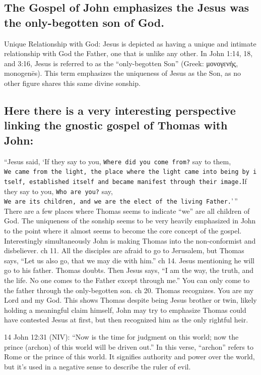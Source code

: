 \subsection{The Gospel of John emphasizes the Jesus was the only-begotten son of God.}\label{subsec:the-gospel-of-john-emphasizes-the-jesus-was-the-only-begotten-son-of-god.}

Unique Relationship with God: Jesus is depicted as having a unique and intimate relationship with God the Father, one that is unlike any other.
In John 1:14, 18, and 3:16, Jesus is referred to as the ``only-begotten Son'' (Greek: μονογενής, monogenēs).
This term emphasizes the uniqueness of Jesus as the Son, as no other figure shares this same divine sonship.

\subsection{Here there is a very interesting perspective linking the gnostic gospel of Thomas with John:}\label{subsec:here-there-is-a-very-interesting-perspective-linking-the-gnostic-gospel-of-thomas-with-john}

``Jesus said, `If they say to you, \texttt{Where\ did\ you\ come\ from?} say to them, \texttt{We\ came\ from\ the\ light,\ the\ place\ where\ the\ light\ came\ into\ being\ by\ itself,\ established\ itself\ and\ became\ manifest\ through\ their\ image.}If they say to you, \texttt{Who\ are\ you?} say, \texttt{We\ are\ its\ children,\ and\ we\ are\ the\ elect\ of\ the\ living\ Father.}'\,'' There are a few places where Thomas seems to indicate ``we'' are all children of God.
The uniqueness of the sonship seems to be very heavily emphasized in John to the point where it almost seems to become the core concept of the gospel.
Interestingly simultaneously John is making Thomas into the non-conformist and disbeliever.
ch 11.
All the disciples are afraid to go to Jerusalem, but Thomas says, ``Let us also go, that we may die with him.'' ch 14.
Jesus mentioning he will go to his father.
Thomas doubts.
Then Jesus says, ``I am the way, the truth, and the life.
No one comes to the Father except through me.'' You can only come to the father through the only-begotten son.
ch 20.
Thomas recognizes.
You are my Lord and my God.
This shows Thomas despite being Jesus brother or twin, likely holding a meaningful claim himself, John may try to emphasize Thomas could have contested Jesus at first, but then recognized him as the only rightful heir.

14 John 12:31 (NIV): ``Now is the time for judgment on this world; now the prince (archon) of this world will be driven out.'' In this verse, ``archon'' refers to Rome or the prince of this world.
It signifies authority and power over the world, but it's used in a negative sense to describe the ruler of evil.

